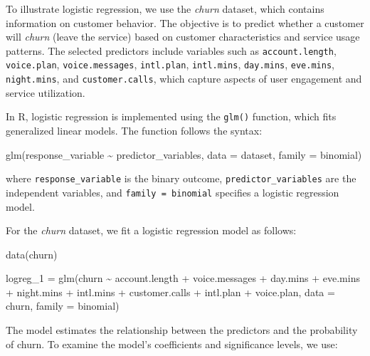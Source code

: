 \documentclass[
  11pt,
]{book}
\makeatletter
\newenvironment{Shaded}{}{}
\newcommand{\AttributeTok}[1]{#1}
\newcommand{\FunctionTok}[1]{#1}
\newcommand{\NormalTok}[1]{#1}
\newcommand{\OtherTok}[1]{\textcolor[rgb]{0.39,0.39,0.39}{#1}}
\newcommand{\SpecialCharTok}[1]{\textcolor[rgb]{0.39,0.39,0.39}{#1}}
\newenvironment{kframe}{%
\medskip{}
\setlength{\fboxsep}{.8em}
 \def\at@end@of@kframe{}%
 \ifinner\ifhmode%
  \def\at@end@of@kframe{\end{minipage}}%
  \begin{minipage}{\columnwidth}%
 \fi\fi%
 \def\FrameCommand##1{\hskip\@totalleftmargin \hskip-\fboxsep
 \colorbox{shadecolor}{##1}\hskip-\fboxsep
     \hskip-\linewidth \hskip-\@totalleftmargin \hskip\columnwidth}%
 \MakeFramed {\advance\hsize-\width
   \@totalleftmargin\z@ \linewidth\hsize
   \@setminipage}}%
 {\par\unskip\endMakeFramed%
 \at@end@of@kframe}
\renewenvironment{Shaded}{\begin{kframe}}{\end{kframe}}
\theoremstyle{definition}
\theoremstyle{definition}
\theoremstyle{definition}
\theoremstyle{definition}
\theoremstyle{remark}
\makeatother
\begin{document}
To illustrate logistic regression, we use the \emph{churn} dataset, which contains information on customer behavior. The objective is to predict whether a customer will \emph{churn} (leave the service) based on customer characteristics and service usage patterns. The selected predictors include variables such as \texttt{account.length}, \texttt{voice.plan}, \texttt{voice.messages}, \texttt{intl.plan}, \texttt{intl.mins}, \texttt{day.mins}, \texttt{eve.mins}, \texttt{night.mins}, and \texttt{customer.calls}, which capture aspects of user engagement and service utilization.

In R, logistic regression is implemented using the \texttt{glm()} function, which fits generalized linear models. The function follows the syntax:

\begin{Shaded}
\begin{Highlighting}[]
\FunctionTok{glm}\NormalTok{(response\_variable }\SpecialCharTok{\textasciitilde{}}\NormalTok{ predictor\_variables, }\AttributeTok{data =}\NormalTok{ dataset, }\AttributeTok{family =}\NormalTok{ binomial)}
\end{Highlighting}
\end{Shaded}

where \texttt{response\_variable} is the binary outcome, \texttt{predictor\_variables} are the independent variables, and \texttt{family\ =\ binomial} specifies a logistic regression model.

For the \emph{churn} dataset, we fit a logistic regression model as follows:

\begin{Shaded}
\begin{Highlighting}[]
\FunctionTok{data}\NormalTok{(churn)}

\NormalTok{logreg\_1 }\OtherTok{=} \FunctionTok{glm}\NormalTok{(churn }\SpecialCharTok{\textasciitilde{}}\NormalTok{ account.length }\SpecialCharTok{+}\NormalTok{ voice.messages }\SpecialCharTok{+}\NormalTok{ day.mins }\SpecialCharTok{+}\NormalTok{ eve.mins }\SpecialCharTok{+} 
\NormalTok{                         night.mins }\SpecialCharTok{+}\NormalTok{ intl.mins }\SpecialCharTok{+}\NormalTok{ customer.calls }\SpecialCharTok{+}\NormalTok{ intl.plan }\SpecialCharTok{+}\NormalTok{ voice.plan, }
               \AttributeTok{data =}\NormalTok{ churn, }\AttributeTok{family =}\NormalTok{ binomial)}
\end{Highlighting}
\end{Shaded}

The model estimates the relationship between the predictors and the probability of churn. To examine the model's coefficients and significance levels, we use:
\end{document}
